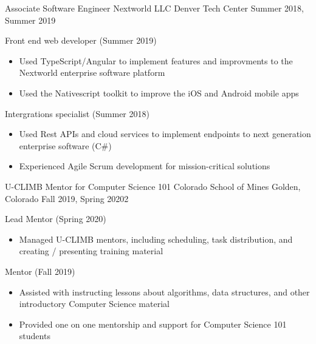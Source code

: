 \vspace{-2.0mm}

\begin{cventries}

  \cventry
    {Associate Software Engineer} %
    {Nextworld LLC} %
    {Denver Tech Center} %
    {Summer 2018, Summer 2019} %
    {
      \begin{cvitems} %
      \item {Front end web developer (Summer 2019)}
      \begin{itemize}
            \item {Used TypeScript/Angular to implement features and
    improvments to the Nextworld enterprise software platform}
        \item {Used the Nativescript toolkit to improve the iOS and
    Android mobile apps}
    \end{itemize}
        \item {Intergrations specialist (Summer 2018)}
        \begin{itemize}
                \item {Used Rest APIs and cloud services to implement
                            endpoints to next generation enterprise software (C\#)}
        \item {Experienced Agile Scrum
    development for mission-critical solutions}
    \end{itemize}
      \end{cvitems}
    }

    \cventry
    	{U-CLIMB Mentor for Computer Science 101}
    	{ Colorado School of Mines }
    	{ Golden, Colorado}
	   	 {Fall 2019, Spring 20202  }
   	 {
   	 \begin{cvitems}
         \item {Lead Mentor (Spring 2020)}
         \begin{itemize}
         \item {Managed U-CLIMB mentors, including scheduling, task
    	distribution, and creating /
    	presenting training material}
         \end{itemize}
         \item {Mentor (Fall 2019)}
         \begin{itemize}
            	 \item {Assisted with instructing lessons about algorithms, data structures, and other introductory Computer Science material}
   	         \item {Provided one on one mentorship and support for
    	Computer Science 101 students}
        \end{itemize}
    \end{cvitems}
    }


\end{cventries}
